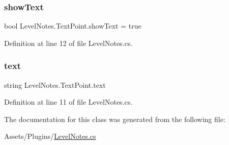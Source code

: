\mbox{\label{class_level_notes_1_1_text_point_aa15313a51da349a12d03b8652ad716e7}} 
\subsubsection{\texorpdfstring{show\+Text}{showText}}
{\footnotesize\ttfamily bool Level\+Notes.\+Text\+Point.\+show\+Text = true}



Definition at line 12 of file Level\+Notes.\+cs.

\mbox{\label{class_level_notes_1_1_text_point_a837d0ff8d8587790f2b93640eb6cbf9e}} 
\subsubsection{\texorpdfstring{text}{text}}
{\footnotesize\ttfamily string Level\+Notes.\+Text\+Point.\+text}



Definition at line 11 of file Level\+Notes.\+cs.



The documentation for this class was generated from the following file\+:\begin{DoxyCompactItemize}
\item 
Assets/\+Plugins/\mbox{\hyperlink{_level_notes_8cs}{Level\+Notes.\+cs}}\end{DoxyCompactItemize}

